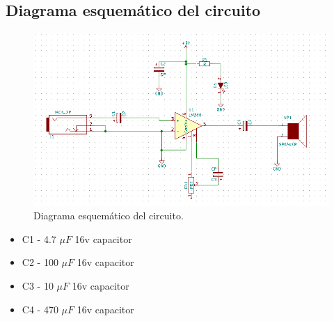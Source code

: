 \subsection{Diagrama esquem\'atico del circuito}

\begin{figure}[!htbp]
\caption{Diagrama esquem\'atico del circuito.}
\centering
\includegraphics [scale=0.80]
{./img/practica02_schematic.png}
\end{figure}

\begin{itemize}
 \item C1 - 4.7 $\mu F$ 16v capacitor
 \item C2 - 100 $\mu F$ 16v capacitor
 \item C3 - 10 $\mu F$ 16v capacitor
 \item C4 - 470 $\mu F$ 16v capacitor
\end{itemize}
